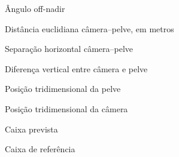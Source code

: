 \begin{simbolos}
\item[$\theta$] Ângulo off-nadir
\item[$d$] Distância euclidiana câmera--pelve, em metros
\item[$r$] Separação horizontal câmera--pelve
\item[$\Delta z$] Diferença vertical entre câmera e pelve
\item[$P$] Posição tridimensional da pelve
\item[$C$] Posição tridimensional da câmera
\item[$B_p$] Caixa prevista
\item[$B_g$] Caixa de referência
\end{simbolos}
